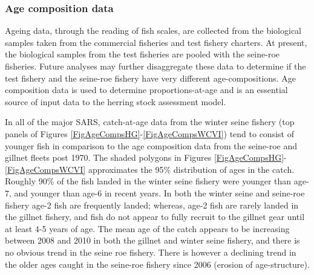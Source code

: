 	
	
	\subsubsection{Age composition data}
	
	Ageing data, through the reading of fish scales, are collected from the biological samples taken from the commercial fisheries and test fishery charters.  At present, the biological samples from the test fisheries are pooled with the seine-roe fisheries. Future analyses may further disaggregate these data to determine if the test fishery and the seine-roe fishery have very different age-compositions. Age composition data is used to determine proportions-at-age and is an essential source of input data to the herring stock assessment model.
	
	In all of the major SARS, catch-at-age data from the winter seine fishery (top panels of Figures \ref{FigAgeCompsHG}-\ref{FigAgeCompsWCVI}) tend to consist of younger fish in comparison to the age composition data from the seine-roe and gillnet fleets post 1970. The shaded polygons in Figures \ref{FigAgeCompsHG}-\ref{FigAgeCompsWCVI} approximates the 95\% distribution of ages in the catch.  Roughly 90\% of the fish landed in the winter seine fishery were younger than age-7, and younger than age-6 in recent years.  In both the winter seine and seine-roe fishery age-2 fish are frequently landed; whereas, age-2 fish are rarely landed in the gillnet fishery, and fish do not appear to fully recruit to the gillnet gear until at least 4-5 years of age.  The mean age of the catch appears to be increasing between 2008 and 2010 in both the gillnet and winter seine fishery, and there is no obvious trend in the seine roe fishery.  There is however a declining trend in the older ages caught in the seine-roe fishery since 2006 (erosion of age-structure).

